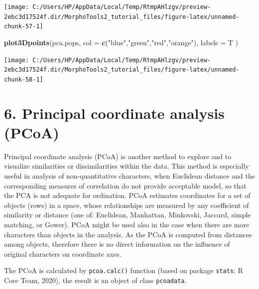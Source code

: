 \documentclass[
]{article}
\newenvironment{Shaded}{\begin{snugshade}}{\end{snugshade}}
\newcommand{\DataTypeTok}[1]{\textcolor[rgb]{0.13,0.29,0.53}{#1}}
\newcommand{\KeywordTok}[1]{\textcolor[rgb]{0.13,0.29,0.53}{\textbf{#1}}}
\newcommand{\NormalTok}[1]{#1}
\newcommand{\StringTok}[1]{\textcolor[rgb]{0.31,0.60,0.02}{#1}}
\begin{document}
\begin{center}\texttt{[image: C:/Users/HP/AppData/Local/Temp/RtmpAHlzgv/preview-2ebc3d17524f.dir/MorphoTools2\_tutorial\_files/figure-latex/unnamed-chunk-57-1]} \end{center}

\begin{Shaded}
\begin{Highlighting}[]
\KeywordTok{plot3Dpoints}\NormalTok{(pca.pops, }\DataTypeTok{col =} \KeywordTok{c}\NormalTok{(}\StringTok{"blue"}\NormalTok{,}\StringTok{"green"}\NormalTok{,}\StringTok{"red"}\NormalTok{,}\StringTok{"orange"}\NormalTok{), }\DataTypeTok{labels =}\NormalTok{ T )}
\end{Highlighting}
\end{Shaded}

\begin{center}\texttt{[image: C:/Users/HP/AppData/Local/Temp/RtmpAHlzgv/preview-2ebc3d17524f.dir/MorphoTools2\_tutorial\_files/figure-latex/unnamed-chunk-58-1]} \end{center}

\hypertarget{principal-coordinate-analysis-pcoa}{%
\section{6. Principal coordinate analysis
(PCoA)}\label{principal-coordinate-analysis-pcoa}}

Principal coordinate analysis (PCoA) is another method to explore and to
visualize similarities or dissimilarities within the data. This method
is especially useful in analysis of non-quantitative characters, when
Euclidean distance and the corresponding measures of correlation do not
provide acceptable model, so that the PCA is not adequate for
ordination. PCoA estimates coordinates for a set of objects (rows) in a
space, whose relationships are measured by any coefficient of similarity
or distance (one of: Euclidean, Manhattan, Minkovski, Jaccard, simple
matching, or Gower). PCoA might be used also in the case when there are
more characters than objects in the analysis. As the PCoA is computed
from distances among objects, therefore there is no direct information
on the influence of original characters on coordinate axes.

The PCoA is calculated by \texttt{pcoa.calc()} function (based on
package \texttt{stats}; R Core Team, 2020), the result is an object of
class \texttt{pcoadata}.
\end{document}
